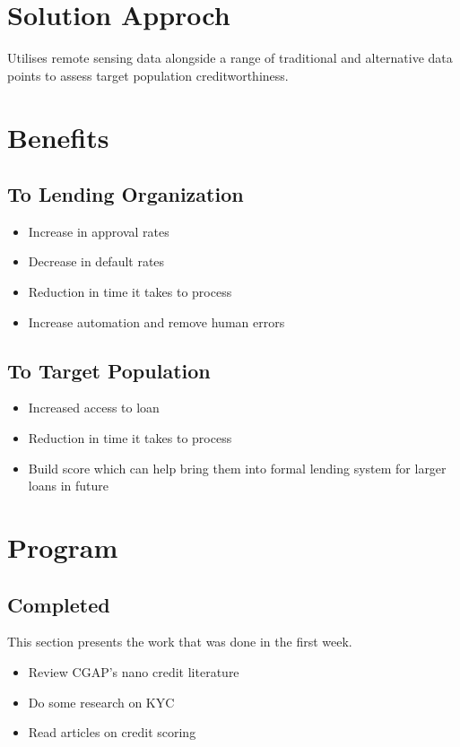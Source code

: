 \documentclass[12pt,a4paper]{amsart}
\numberwithin{equation}{section}
\theoremstyle{plain}
\theoremstyle{definition}
\begin{document}
\section{Solution Approch}
Utilises remote sensing data alongside a range of traditional and alternative data points to assess target population creditworthiness.
\section{Benefits}

\subsection{To Lending Organization}
\begin{itemize}
 \item Increase in approval rates
 \item Decrease in default rates
 \item Reduction in time it takes to process
 \item Increase automation and remove human errors
\end{itemize}

\subsection{To Target Population}
\begin{itemize}
 \item Increased access to loan
 \item Reduction in time it takes to process
 \item Build score which can help bring them into formal lending system for larger loans in future
\end{itemize}

\section{Program}

\subsection{Completed}
This section presents the work that was done in the first week.
\begin{itemize}
 \item Review CGAP's nano credit literature
 \item Do some research on KYC
 \item Read articles on credit scoring
\end{itemize}
\end{document}
